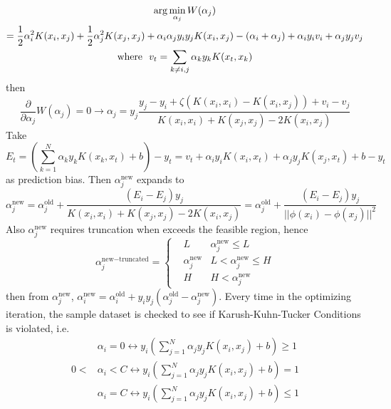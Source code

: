 \documentclass[12pt]{article}
\newcommand{\new}{\text{new}}
\newcommand{\old}{\text{old}}
\begin{document}
\begin{gather}
    \arg \min_{\alpha_j} W(\alpha_j) \notag \\= \frac{1}{2}\alpha_i^2K(x_i, x_j) + \frac{1}{2}\alpha_j^2K(x_j, x_j) + \alpha_i\alpha_jy_iy_jK(x_i, x_j)-(\alpha_i+\alpha_j) + \alpha_iy_iv_i+\alpha_jy_jv_j \\
    \text{where}~~v_t = \sum_{k\neq i,j} \alpha_k y_k K(x_t, x_k)
\end{gather}
then
\begin{equation}
    \frac{\partial}{\partial \alpha_j}W(\alpha_j) = 0 \rightarrow \alpha_j = y_j \frac{y_j - y_i + \zeta(K(x_i, x_i) - K(x_i, x_j))+v_i - v_j}{K(x_i,x_i) + K(x_j, x_j) - 2K(x_i, x_j)}
    \label{val}
\end{equation}
Take 
\begin{equation}
    E_t = (
    \sum_{k=1}^N \alpha_k y_k K(x_k, x_t) + b
) - y_t = v_t + \alpha_iy_iK(x_i, x_t) + \alpha_jy_jK(x_j,x_t) + b - y_t
\end{equation} 
as prediction bias. Then $\alpha_j^{\new}$ expands to
\begin{equation}
    \alpha_j^{\new} = \alpha_j^{\old} + \frac{(E_i - E_j)y_j}{K(x_i, x_i) + K(x_j, x_j) - 2K(x_i, x_j)} = \alpha_j^{\old} + \frac{(E_i - E_j)y_j}{||\phi(x_i) - \phi(x_j)||^2}
\end{equation}
Also $\alpha_j^{\new}$ requires truncation when exceeds the feasible region, hence
\begin{equation}
    \alpha_j^{\new-\text{truncated}} = \left\{ \begin{aligned} &L &\alpha_j^{\new} \leq L \\
    &\alpha_{j}^{\new} & L < \alpha_j^{\new} \leq H \\
    &H &H < \alpha_j^{\new} \end{aligned}\right.
\end{equation}
then from $\alpha_j^{\new}$, $\alpha_i^{\new} = \alpha_i^{\old} + y_iy_j(\alpha_j^{\old} - \alpha_j^{\new})$.
Every time in the optimizing iteration, the sample dataset is checked to see if Karush-Kuhn-Tucker Conditions is violated, i.e.
\begin{equation}
    \begin{aligned}
    &\alpha_i = 0 \leftrightarrow y_i(\sum_{j=1}^N \alpha_j y_jK(x_i, x_j) + b) \geq 1 \\
     0 < &\alpha_i <   C \leftrightarrow y_i(\sum_{j=1}^N \alpha_j y_jK(x_i, x_j) + b) = 1 \\
     &\alpha_i = C \leftrightarrow y_i(\sum_{j=1}^N \alpha_j y_jK(x_i, x_j) + b) \leq 1
    \end{aligned}
\end{equation}
\end{document}
